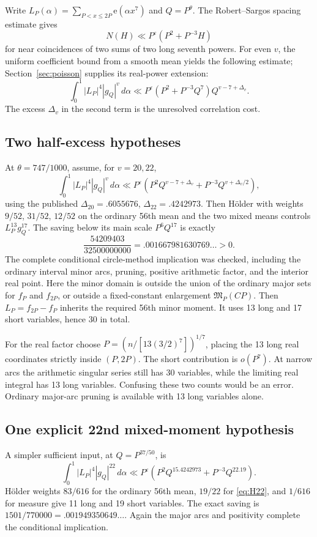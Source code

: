 \documentclass[11pt,letterpaper]{article}
\theoremstyle{remark}
\newcommand{\M}{\mathfrak M}
\newcommand{\eps}{\varepsilon}
\newcommand{\dd}{\,d\alpha}
\newcommand{\e}{\mathrm e}
\begin{document}
Write $L_P(\alpha)=\sum_{P<x\le2P}\e(\alpha x^7)$ and $Q=P^\theta$.
The Robert--Sargos spacing estimate \cite[Theorem~2]{RS06} gives
\[
 N(H)\ll P^\eps(P^2+P^{-3}H)
\]
for near coincidences of two sums of two long seventh powers. For even $v$, the
uniform coefficient bound from a smooth mean yields the following estimate;
Section~\ref{sec:poisson} supplies its real-power extension:
\[
 \int_0^1|L_P|^4|g_Q|^v\dd
       \ll P^\eps(P^2+P^{-3}Q^7)Q^{v-7+\Delta_v}.
\]
The excess $\Delta_v$ in the second term is the unresolved correlation cost.

\subsection{Two half-excess hypotheses}

At $\theta=747/1000$, assume, for $v=20,22$,
\begin{equation}\label{eq:Hv}
 \int_0^1|L_P|^4|g_Q|^v\dd\ll P^\eps
       \left(P^2Q^{v-7+\Delta_v}+P^{-3}Q^{v+\Delta_v/2}\right),
\end{equation}
using the published $\Delta_{20}=.6055676$, $\Delta_{22}=.4242973$.
Then H\"older with weights $9/52$, $31/52$, $12/52$ on the ordinary 56th mean and
the two mixed means controls $L_P^{13}g_Q^{17}$. The saving below its main scale
$P^6Q^{17}$ is exactly
\[
 \frac{54209403}{32500000000}=.001667981630769\ldots>0.
\]
The complete conditional circle-method implication was checked, including the
ordinary interval minor arcs, pruning, positive arithmetic factor, and the interior
real point. Here the minor domain is outside the union of the ordinary major sets
for $f_P$ and $f_{2P}$, or outside a fixed-constant enlargement $\M_P(CP)$.
Then $L_P=f_{2P}-f_P$ inherits the required 56th minor moment.
It uses 13 long and 17 short variables, hence 30 in total.

For the real factor choose $P=(n/[13(3/2)^7])^{1/7}$, placing the 13 long real
coordinates strictly inside $(P,2P)$. The short contribution is $o(P^7)$.
At narrow arcs the arithmetic singular series still has 30 variables, while the
limiting real integral has 13 long variables. Confusing these two counts would be an
error. Ordinary major-arc pruning is available with 13 long variables alone.

\subsection{One explicit 22nd mixed-moment hypothesis}

A simpler sufficient input, at $Q=P^{37/50}$, is
\begin{equation}\label{eq:H22}
 \int_0^1|L_P|^4|g_Q|^{22}\dd\ll P^\eps
       \left(P^2Q^{15.4242973}+P^{-3}Q^{22.19}\right).
\end{equation}
H\"older weights $83/616$ for the ordinary 56th mean, $19/22$ for
\eqref{eq:H22}, and $1/616$ for measure give 11 long and 19 short variables.
The exact saving is $1501/770000=.001949350649\ldots$.
Again the major arcs and positivity complete the conditional implication.
\end{document}
